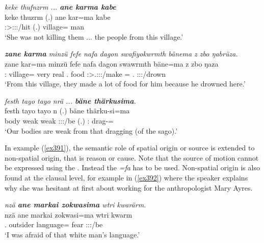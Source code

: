\begin{exe}
	\ex \emph{keke thufnzrm ... \textbf{ane karma kabe}}\\
	\gll keke thuzrm (.) ane kar=ma kabe\\
	{\Neg} \Stsg:\Sbj>\Stpl:\Obj:\Pst:\Dur/hit (.) {\Dem} village={\Char} man\\
	\trans `She was not killing them ... the people from this village.'
	\label{ex419}
\end{exe}
\begin{exe}
	\ex \emph{\textbf{zane karma} minzü fefe nafa dagon swafiyokwrmth bänema z zbo ŋabrüza.}\\
	\gll zane kar=ma minzü fefe nafa dagon swawrmth bäne=ma z zbo ŋaza\\
	\Dem:{\Prox} village={\Char} very real \Tnsg.{\Erg} food \Stpl:\Sbj>\Tsg.\Masc:\Io:\Pst:\Dur/make \Recog={\Char} {\Iam} \Prox.{\All} \Sg:\Sbj:\Pst:\Ipfv/drown\\
	\trans `From this village, they made a lot of food for him because he drowned here.'\\
	\label{ex390}
\end{exe}
\begin{exe}
	\ex \emph{festh tayo tayo nrä ... \textbf{bäne thärkusima}.}\\
	\gll festh tayo tayo n (.) bäne thärku-si=ma\\
	body weak weak \Fpl:\Sbj:\Nonpast:\Ipfv/be (.) \Dem:\Med{} drag-\Nmlz={\Char}\\
	\trans `Our bodies are weak from that dragging (of the sago).'
	\label{ex391}
\end{exe}

In example (\ref{ex391}), the semantic role of spatial origin or source is extended to non-spatial origin, that is reason or cause. Note that the source of motion cannot be expressed using the  . Instead the  \emph{=fa} has to be used. Non-spatial origin is also found at the clausal level, for example in (\ref{ex392}) where the speaker explains why she was hesitant at first about working for the anthropologist Mary Ayres.

\begin{exe}
	\ex \emph{nzä \textbf{ane markai zokwasima} wtri kwarärm.}\\
	\gll nzä ane markai zokwasi=ma wtri kwarm\\
	\Fsg.{\Abs} {\Dem} outsider language={\Char} fear \Fsg:\Sbj:\Pst:\Dur/be\\
	\trans `I was afraid of that white man's language.'
	\label{ex392}
\end{exe}

